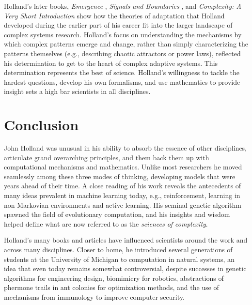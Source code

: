 \documentclass{sig-alternate}
\begin{document}

Holland's later books, \emph{Emergence} \cite{Holland2000},
\emph{Signals and Boundaries} \cite{Holland2012}, and
\emph{Complexity: A Very Short Introduction} \cite{Holland2014} show how the
theories of adaptation that Holland developed during the earlier part
of his career fit into the larger landscape of complex systems
research.  Holland's focus on understanding the mechanisms by which complex patterns emerge and change,
rather than simply characterizing the patterns themselves (e.g.,
describing chaotic attractors or power laws), reflected his
determination to get to the heart of complex adaptive systems.
This determination represents the best of science.  Holland's
willingness to tackle the hardest questions, develop his own
formalisms, and use mathematics to provide insight sets a high bar 
scientists in all disciplines.



\section{Conclusion}

John Holland was unusual in his ability to absorb the essence of other
disciplines, articulate grand overarching
principles, and them back them up with computational mechanisms and
mathematics.  Unlike most researchers he moved seamlessly among these
three modes of thinking, developing models that were years ahead of their time.  A
close reading of his work reveals the antecedents of many ideas prevalent in
machine learning today, e.g., reinforcement, learning in non-Markovian
environments and active learning.   His seminal genetic algorithm
spawned the field of evolutionary computation, and his insights
and wisdom helped define what are now referred to as the
\emph{sciences of complexity}.   

Holland's many books and articles have influenced scientists around
the work and across many disciplines.  Closer to home, he introduced
several generations of students at the University of Michigan to
computation in natural systems, an idea that even today remains
somewhat controversial, despite successes in genetic algorithms for
engineering design, biomimicry for robotics, abstractions of phermone
trails in ant colonies for optimization methods, and the use of
mechanisms from immunology to improve computer security.
\end{document}
